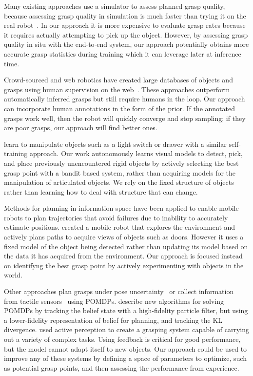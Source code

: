 \documentclass{article}
\begin{document}
Many existing approaches use a simulator to assess planned grasp
quality, because assessing grasp quality in simulation is much faster
than trying it on the real robot~\citet{miller04}.  In our approach
it is more expensive to evaluate grasp rates because it
requires actually attempting to pick up the object.  However, by
assessing grasp quality in situ with the end-to-end system, our approach
potentially obtains more accurate grasp statistics 
during training which it can leverage later at inference time.

Crowd-sourced and web robotics have created large databases of objects
and grasps using human supervision on the web~\citep{kent14a, kent14}.
These approaches outperform automatically inferred grasps but still
require humans in the loop.  Our approach can incorporate human
annotations in the form of the prior.  If the annotated grasps work
well, then the robot will quickly converge and stop sampling; if they
are poor grasps, our approach will find better ones.

\citet{nguyen14} learn to manipulate objects such as a light switch or drawer
with a similar self-training approach.  Our work autonomously learns visual
models to detect, pick, and place previously unencountered rigid objects by actively
selecting the best grasp point with a bandit based system, rather than
acquiring models for the manipulation of articulated objects. We rely on
the fixed structure of objects rather than learning how to deal
with structure that can change.

Methods for planning in information space \citep{he08, atanasov13,
  prentice09} have been applied to enable mobile robots to plan
trajectories that avoid failures due to inability to accurately
estimate positions.  \citet{velez11} created a mobile robot that
explores the environment and actively plans paths to acquire views of
objects such as doors.  However it uses a fixed model of the object
being detected rather than updating its model based on the data it has
acquired from the environment.  Our approach is focused instead on
identifyng the best grasp point by actively experimenting with objects
in the world.

Other approaches plan grasps under pose uncertainty~\citep{stulp11} or
collect information from tactile sensors~\citep{hsiao10} using
POMDPs.  \citet{platt11} describe new algorithms for solving POMDPs by
tracking the belief state with a high-fidelity particle filter, but using
a lower-fidelity representation of belief for planning, and tracking
the KL divergence.  \citet{hudson12} used active perception to create
a grasping system capable of carrying out a variety of complex tasks.
Using feedback is critical for good performance, but the model cannot
adapt itself to new objects.  Our approach could be used to improve
any of these systems by defining a space of parameters to optimize,
such as potential grasp points, and then assessing the performance
from experience.
\end{document}
